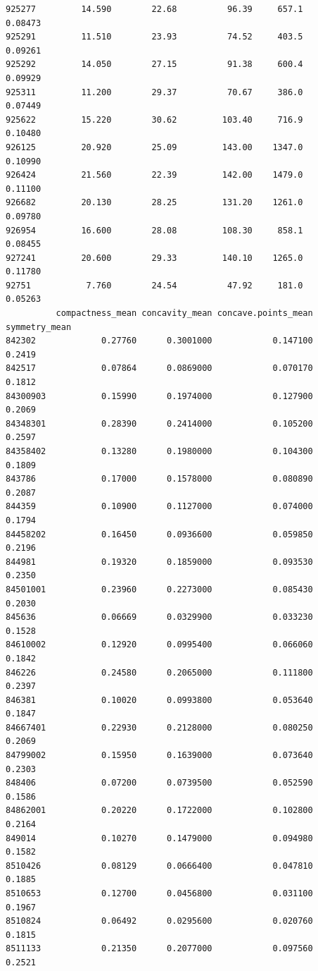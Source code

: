 \documentclass[
  letterpaper,
  DIV=11,
  numbers=noendperiod]{scrartcl}
\begin{document}
\begin{verbatim}
925277         14.590        22.68          96.39     657.1         0.08473
925291         11.510        23.93          74.52     403.5         0.09261
925292         14.050        27.15          91.38     600.4         0.09929
925311         11.200        29.37          70.67     386.0         0.07449
925622         15.220        30.62         103.40     716.9         0.10480
926125         20.920        25.09         143.00    1347.0         0.10990
926424         21.560        22.39         142.00    1479.0         0.11100
926682         20.130        28.25         131.20    1261.0         0.09780
926954         16.600        28.08         108.30     858.1         0.08455
927241         20.600        29.33         140.10    1265.0         0.11780
92751           7.760        24.54          47.92     181.0         0.05263
          compactness_mean concavity_mean concave.points_mean symmetry_mean
842302             0.27760      0.3001000            0.147100        0.2419
842517             0.07864      0.0869000            0.070170        0.1812
84300903           0.15990      0.1974000            0.127900        0.2069
84348301           0.28390      0.2414000            0.105200        0.2597
84358402           0.13280      0.1980000            0.104300        0.1809
843786             0.17000      0.1578000            0.080890        0.2087
844359             0.10900      0.1127000            0.074000        0.1794
84458202           0.16450      0.0936600            0.059850        0.2196
844981             0.19320      0.1859000            0.093530        0.2350
84501001           0.23960      0.2273000            0.085430        0.2030
845636             0.06669      0.0329900            0.033230        0.1528
84610002           0.12920      0.0995400            0.066060        0.1842
846226             0.24580      0.2065000            0.111800        0.2397
846381             0.10020      0.0993800            0.053640        0.1847
84667401           0.22930      0.2128000            0.080250        0.2069
84799002           0.15950      0.1639000            0.073640        0.2303
848406             0.07200      0.0739500            0.052590        0.1586
84862001           0.20220      0.1722000            0.102800        0.2164
849014             0.10270      0.1479000            0.094980        0.1582
8510426            0.08129      0.0666400            0.047810        0.1885
8510653            0.12700      0.0456800            0.031100        0.1967
8510824            0.06492      0.0295600            0.020760        0.1815
8511133            0.21350      0.2077000            0.097560        0.2521

\end{verbatim}
\end{document}
